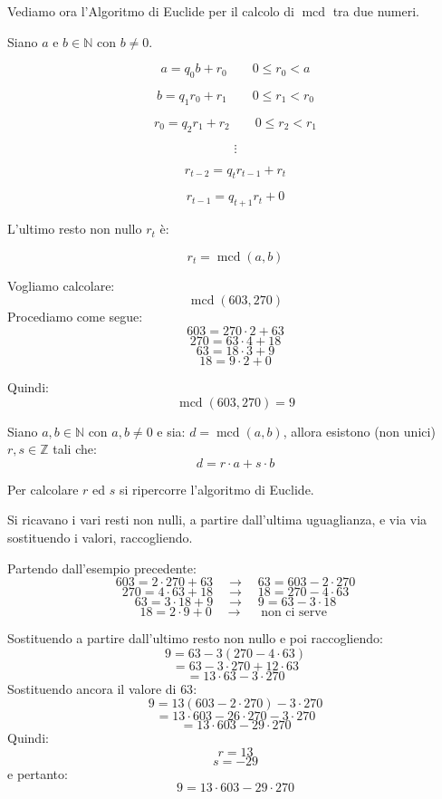 \documentclass[
  a4paper,
]{article}
\begin{document}
Vediamo ora l'Algoritmo di Euclide per il calcolo di
\(\operatorname{mcd}\) tra due numeri.

Siano \(a\) e \(b \in \mathbb{N}\) con \(b \neq 0\).

\[
a = q_0 b + r_0
\qquad 0 \leq r_0 < a
\]

\[
b = q_1 r_0 + r_1
\qquad 0 \leq r_1 < r_0
\]

\[
r_0 = q_2 r_1 + r_2
\qquad 0 \leq r_2 < r_1
\]

\[
\vdots
\]

\[
r_{t-2} = q_t r_{t-1} + r_t
\]

\[
r_{t-1} = q_{t+1} r_t + 0
\]

L'ultimo resto non nullo \(r_t\) è:

\[
r_t = \operatorname{mcd}(a,b)
\]

\begin{examplebox}
Vogliamo calcolare: \[
\operatorname{mcd}(603,270)
\] Procediamo come segue: \[
603 = 270 \cdot 2 + 63
\] \[
270 = 63 \cdot 4 + 18
\] \[
63 = 18 \cdot 3 + 9
\] \[
18 = 9 \cdot 2 + 0
\]

Quindi: \[
\operatorname{mcd}(603,270)=9
\]
\end{examplebox}

\begin{teoremabox}
Siano \(a,b \in \mathbb{N}\) con \(a,b \neq 0\) e sia:
\(d = \operatorname{mcd}(a,b)\), allora esistono (non unici)
\(r,s \in \mathbb{Z}\) tali che: \[
d = r\cdot a + s\cdot b
\]
\end{teoremabox}

Per calcolare \(r\) ed \(s\) si ripercorre l'algoritmo di Euclide.

Si ricavano i vari resti non nulli, a partire dall'ultima uguaglianza, e
via via sostituendo i valori, raccogliendo.

\begin{examplebox}
Partendo dall'esempio precedente: \[
603 = 2 \cdot 270 + 63 \quad \to \quad 63 = 603 - 2 \cdot 270
\] \[
270 = 4 \cdot 63 + 18 \quad \to \quad 18 = 270 - 4 \cdot 63
\] \[
63 = 3 \cdot 18 + 9 \quad \to \quad 9 = 63 - 3 \cdot 18
\] \[
18 = 2 \cdot 9 + 0 \quad\to\quad \text{ non ci serve } 
\]

Sostituendo a partire dall'ultimo resto non nullo e poi raccogliendo: \[
9 = 63 - 3(270 - 4\cdot63)
\] \[
= 63 - 3\cdot270 + 12\cdot63
\] \[
= 13\cdot63 - 3\cdot270
\] Sostituendo ancora il valore di \(63\): \[
9 = 13(603 - 2\cdot270) - 3\cdot270
\] \[
= 13\cdot603 - 26\cdot270 - 3\cdot270
\] \[
= 13\cdot603 - 29\cdot270
\] Quindi: \[
r = 13
\] \[
s = -29
\] e pertanto: \[
9 = 13\cdot603 - 29\cdot270
\]
\end{examplebox}
\end{document}
